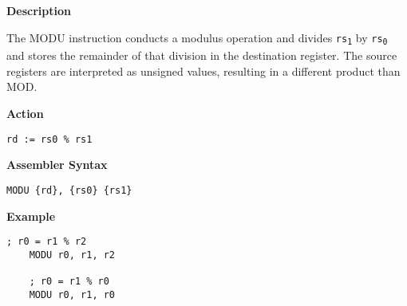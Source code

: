 \textbf{Description}

The MODU instruction conducts a modulus operation and divides \texttt{rs\textsubscript{1}} by \texttt{rs\textsubscript{0}} and stores the remainder of that division in the destination register.
The source registers are interpreted as unsigned values, resulting in a different product than MOD.

\vspace{3ex}

\textbf{Action}
\begin{lstlisting}[frame=single]
	rd := rs0 % rs1
\end{lstlisting}

\vspace{3ex}

\textbf{Assembler Syntax}
\begin{lstlisting}[frame=single]
	MODU {rd}, {rs0} {rs1}
\end{lstlisting}

\vspace{3ex}

\textbf{Example}
\begin{lstlisting}[frame=single]
	; r0 = r1 % r2
	MODU r0, r1, r2
	
	; r0 = r1 % r0
	MODU r0, r1, r0
\end{lstlisting}
